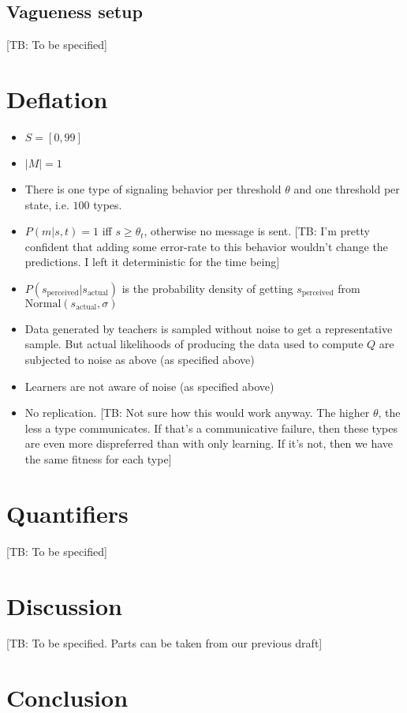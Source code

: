 \documentclass[11pt]{article}
\newcommand{\tb}[1]{\textcolor[rgb]{.8,.33,.0}{[TB: #1]}}%
\begin{document}
\subsection{Vagueness setup}
\tb{To be specified}
\section{Deflation}
\begin{itemize}
  \item $S = [0,99]$
  \item $|M| = 1$
  \item There is one type of signaling behavior per threshold $\theta$ and one threshold per state, i.e. $100$ types.
  \item $P(m|s,t) = 1$ iff $s \geq \theta_t$, otherwise no message is sent. \tb{I'm pretty confident that adding some error-rate to this behavior wouldn't change the predictions. I left it deterministic for the time being}
  \item $P(s_{\text{perceived}} | s_{\text{actual}})$ is the probability density of getting $s_{\text{perceived}}$ from $\text{Normal}(s_{\text{actual}},\sigma)$
  \item Data generated by teachers is sampled without noise to get a representative sample. But actual likelihoods of producing the data used to compute $Q$ are subjected to noise as above (as specified above)
  \item Learners are not aware of noise (as specified above)
  \item No replication. \tb{Not sure how this would work anyway. The higher $\theta$, the less a type communicates. If that's a communicative failure, then these types are even more dispreferred than with only learning. If it's not, then we have the same fitness for each type}
\end{itemize}

\section{Quantifiers}
\tb{To be specified} 

\section{Discussion}
\tb{To be specified. Parts can be taken from our previous draft} 

\section{Conclusion}




\end{document}
